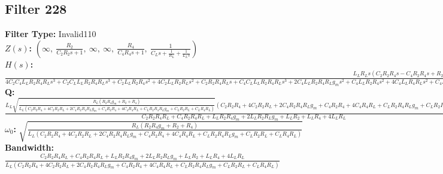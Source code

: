 \documentclass{article}
\begin{document}
\subsection*{Filter 228}
\textbf{Filter Type:} Invalid110 \\ 
\textbf{$Z(s)$:} $\left( \infty, \  \frac{R_{2}}{C_{2} R_{2} s + 1}, \  \infty, \  \infty, \  \frac{R_{4}}{C_{4} R_{4} s + 1}, \  \frac{1}{C_{L} s + \frac{1}{R_{L}} + \frac{1}{L_{L} s}}\right)$ \\ 
\textbf{$H(s)$:} $\frac{L_{L} R_{L} s \left(C_{2} R_{2} R_{4} s - C_{4} R_{2} R_{4} s + R_{2} R_{4} g_{m} - R_{2} + R_{4}\right)}{4 C_{2} C_{4} L_{L} R_{2} R_{4} R_{L} s^{3} + C_{2} C_{L} L_{L} R_{2} R_{4} R_{L} s^{3} + C_{2} L_{L} R_{2} R_{4} s^{2} + 4 C_{2} L_{L} R_{2} R_{L} s^{2} + C_{2} R_{2} R_{4} R_{L} s + C_{4} C_{L} L_{L} R_{2} R_{4} R_{L} s^{3} + 2 C_{4} L_{L} R_{2} R_{4} R_{L} g_{m} s^{2} + C_{4} L_{L} R_{2} R_{4} s^{2} + 4 C_{4} L_{L} R_{4} R_{L} s^{2} + C_{4} R_{2} R_{4} R_{L} s + C_{L} L_{L} R_{2} R_{4} R_{L} g_{m} s^{2} + C_{L} L_{L} R_{2} R_{L} s^{2} + C_{L} L_{L} R_{4} R_{L} s^{2} + L_{L} R_{2} R_{4} g_{m} s + 2 L_{L} R_{2} R_{L} g_{m} s + L_{L} R_{2} s + L_{L} R_{4} s + 4 L_{L} R_{L} s + R_{2} R_{4} R_{L} g_{m} + R_{2} R_{L} + R_{4} R_{L}}$ \\ 
\textbf{Q:} $\frac{L_{L} \sqrt{\frac{R_{L} \left(R_{2} R_{4} g_{m} + R_{2} + R_{4}\right)}{L_{L} \left(C_{2} R_{2} R_{4} + 4 C_{2} R_{2} R_{L} + 2 C_{4} R_{2} R_{4} R_{L} g_{m} + C_{4} R_{2} R_{4} + 4 C_{4} R_{4} R_{L} + C_{L} R_{2} R_{4} R_{L} g_{m} + C_{L} R_{2} R_{L} + C_{L} R_{4} R_{L}\right)}} \left(C_{2} R_{2} R_{4} + 4 C_{2} R_{2} R_{L} + 2 C_{4} R_{2} R_{4} R_{L} g_{m} + C_{4} R_{2} R_{4} + 4 C_{4} R_{4} R_{L} + C_{L} R_{2} R_{4} R_{L} g_{m} + C_{L} R_{2} R_{L} + C_{L} R_{4} R_{L}\right)}{C_{2} R_{2} R_{4} R_{L} + C_{4} R_{2} R_{4} R_{L} + L_{L} R_{2} R_{4} g_{m} + 2 L_{L} R_{2} R_{L} g_{m} + L_{L} R_{2} + L_{L} R_{4} + 4 L_{L} R_{L}}$ \\ 
\textbf{$\omega_0$:} $\sqrt{\frac{R_{L} \left(R_{2} R_{4} g_{m} + R_{2} + R_{4}\right)}{L_{L} \left(C_{2} R_{2} R_{4} + 4 C_{2} R_{2} R_{L} + 2 C_{4} R_{2} R_{4} R_{L} g_{m} + C_{4} R_{2} R_{4} + 4 C_{4} R_{4} R_{L} + C_{L} R_{2} R_{4} R_{L} g_{m} + C_{L} R_{2} R_{L} + C_{L} R_{4} R_{L}\right)}}$ \\ 
\textbf{Bandwidth:} $\frac{C_{2} R_{2} R_{4} R_{L} + C_{4} R_{2} R_{4} R_{L} + L_{L} R_{2} R_{4} g_{m} + 2 L_{L} R_{2} R_{L} g_{m} + L_{L} R_{2} + L_{L} R_{4} + 4 L_{L} R_{L}}{L_{L} \left(C_{2} R_{2} R_{4} + 4 C_{2} R_{2} R_{L} + 2 C_{4} R_{2} R_{4} R_{L} g_{m} + C_{4} R_{2} R_{4} + 4 C_{4} R_{4} R_{L} + C_{L} R_{2} R_{4} R_{L} g_{m} + C_{L} R_{2} R_{L} + C_{L} R_{4} R_{L}\right)}$ \\ 
\end{document}
